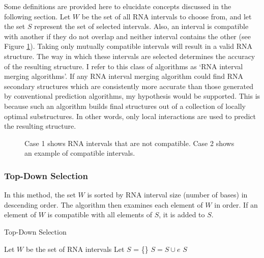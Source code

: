 \documentclass{cshonours}
\begin{document}
Some definitions are provided here to elucidate concepts discussed in the following section. Let $W$ be the set of all RNA intervals to choose from, and let the set $S$ represent the set of selected intervals. Also, an interval is compatible with another if they do not overlap and neither interval contains the other (see Figure \ref{fig:compatible}). Taking only mutually compatible intervals will result in a valid RNA  structure. The way in which these intervals are selected determines the accuracy of the resulting structure. I refer to this class of algorithms as `RNA interval merging algorithms'. If any RNA interval merging algorithm could find RNA secondary structures which are consistently more accurate than those generated by conventional prediction algorithms, my hypothesis would be supported. This is because such an algorithm builds final structures out of a collection of locally optimal substructures. In other words, only local interactions are used to predict the resulting structure.

\begin{figure}
\begin{center}
\end{center}
\caption{Case 1 shows RNA intervals that are not compatible. Case 2 shows an example of compatible intervals.}
\label{fig:compatible}
\end{figure}


\subsubsection{Top-Down Selection}
In this method, the set $W$ is sorted by RNA interval size (number of bases) in descending order. The algorithm then examines each element of $W$ in order. If an element of $W$ is compatible with all elements of $S$, it is added to $S$.

\begin{algorithm}
  \caption{Top-Down Selection}
  \label{tds}
  \begin{algorithmic}[1]
  \State Let $W$ be the set of RNA intervals
  \State Let $S$ = \{\}
  \State {}
  		\State $S = S \cup e$
  	\EndIf
  \EndFor
  \State \Return $S$
  \end{algorithmic}
\end{algorithm}
\end{document}
